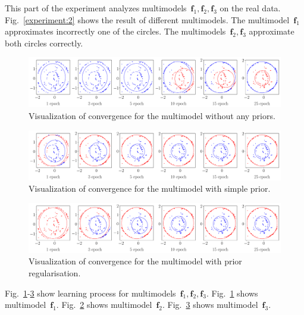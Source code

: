 \documentclass[12pt, twoside]{article}
\numberwithin{equation}{section}
\begin{document}
This part of the experiment analyzes multimodels~$\textbf{f}_1, \textbf{f}_2, \textbf{f}_3$ on the real data.
Fig.~\ref{experiment:2} shows the result of different multimodels.
The multimodel~$\textbf{f}_1$ approximates incorrectly one of the circles.
The multimodels~$\textbf{f}_2, \textbf{f}_3$ approximate both circles correctly.

\begin{figure}[h!t]\center
\includegraphics[width=1\textwidth]{result_eng/experiment_real_not_prior}
\caption{Visualization of convergence for the multimodel without any priors.}
\label{experiment:3}
\end{figure}

\begin{figure}[h!t]\center
\includegraphics[width=1\textwidth]{result_eng/experiment_real_prior}
\caption{Visualization of convergence for the multimodel with simple prior.}
\label{experiment:4}
\end{figure}

\begin{figure}[h!t]\center
\includegraphics[width=1\textwidth]{result_eng/experiment_real_regular}
\caption{Visualization of convergence for the multimodel with prior regularisation.}
\label{experiment:5}
\end{figure}

Fig.~\ref{experiment:3}-\ref{experiment:5} show learning process for multimodels~$\textbf{f}_1, \textbf{f}_2, \textbf{f}_3$.
Fig.~\ref{experiment:3} shows multimodel~$\textbf{f}_1$.
Fig.~\ref{experiment:4} shows multimodel~$\textbf{f}_2$.
Fig.~\ref{experiment:5} shows multimodel~$\textbf{f}_3$.
\end{document}
